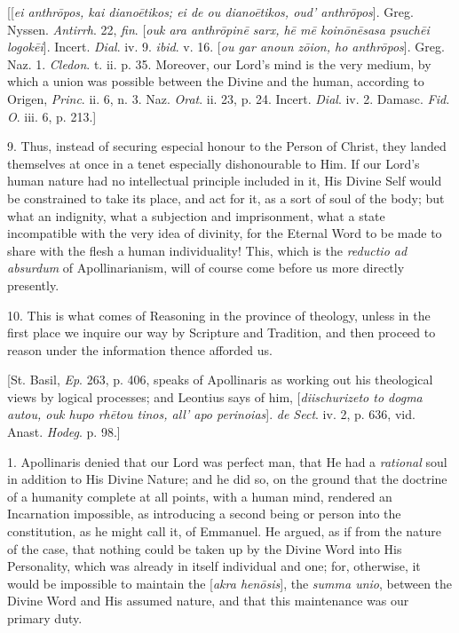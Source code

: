 [[\emph{ei anthr\={o}pos, kai diano\={e}tikos; ei de ou diano\={e}tikos,
oud' anthr\={o}pos}]. Greg. Nyssen. \emph{Antirrh}. 22, \emph{fin}.
[\emph{ouk ara anthr\={o}pin\={e} sarx, h\={e} m\={e} koin\={o}n\={e}sasa
psuch\={e}i logok\={e}i}]. Incert. \emph{Dial}. iv. 9. \emph{ibid}.
v. 16. [\emph{ou gar anoun z\={o}ion, ho anthr\={o}pos}]. Greg.
Naz. 1. \emph{Cledon}. t. ii. p. 35. Moreover, our Lord's mind is the
very medium, by which a union was possible between the Divine and the
human, according to Origen, \emph{Princ}. ii. 6, n. 3. Naz. \emph{Orat}.
ii. 23, p. 24. Incert. \emph{Dial}. iv. 2. Damasc. \emph{Fid. O}. iii.
6, p. 213.]

9. Thus, instead of securing especial honour to the Person of
Christ, they landed themselves at once in a tenet especially
dishonourable to Him. If our Lord's human nature had no intellectual
principle included in it, His Divine Self would be constrained to take
its place, and act for it, as a sort of soul of the body; but what an
indignity, what a subjection and imprisonment, what a state
incompatible with the very idea of divinity, for the Eternal Word to
be made to share with the flesh a human individuality! This, which is
the \emph{reductio ad absurdum} of Apollinarianism, will of course
come before us more directly presently.

10. This is what comes of Reasoning in the province of theology,
unless in the first place we inquire our way by Scripture and
Tradition, and then proceed to reason under the information thence
afforded us.

[St. Basil, \emph{Ep}. 263, p. 406, speaks of Apollinaris as
working out his theological views by logical processes; and Leontius
says of him, [\emph{diischurizeto to dogma autou, ouk hupo rh\={e}tou
tinos, all' apo perinoias}]. \emph{de Sect}. iv. 2, p. 636, vid.
Anast. \emph{Hodeg}. p. 98.]


1. Apollinaris denied that our Lord was perfect man, that He had a \emph{rational}
soul in addition to His Divine Nature; and he did so, on the ground
that the doctrine of a humanity complete at all points, with a human
mind, rendered an Incarnation impossible, as introducing a second
being or person into the constitution, as he might call it, of
Emmanuel. He argued, as if from the nature of the case, that nothing
could be taken up by the Divine Word into His Personality, which was
already in itself individual and one; for, otherwise, it would be
impossible to maintain the [\emph{akra hen\={o}sis}], the \emph{summa
unio}, between the Divine Word and His assumed nature, and that
this maintenance was our primary duty.

